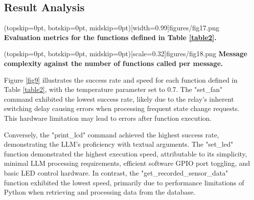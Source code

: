 \documentclass{ieeeaccess}
\begin{document}


\subsection{Result Analysis}
\Figure[h!](topskip=0pt, botskip=0pt,
midskip=0pt)[width=0.99\columnwidth]{{figures/fig17.png}}
{ \textbf{Evaluation metrics for the functions defined in Table \ref{table2}.}\label{fig9}}

\Figure[t!](topskip=0pt, botskip=0pt,
midskip=0pt)[scale=0.32]{{figures/fig18.png}}
{ \textbf{Message complexity against the number of functions called per message.}\label{fig10}}

Figure \ref{fig9} illustrates the success rate and speed for each function defined in Table \ref{table2}, with the temperature parameter set to 0.7. The "set\_fan" command exhibited the lowest success rate, likely due to the relay's inherent switching delay causing errors when processing frequent state change requests. This hardware limitation may lead to errors after function execution.  

Conversely, the "print\_lcd" command achieved the highest success rate, demonstrating the LLM's proficiency with textual arguments. The "set\_led" function demonstrated the highest execution speed, attributable to its simplicity, minimal LLM processing requirements, efficient software GPIO port toggling, and basic LED control hardware. In contrast, the "get\_recorded\_sensor\_data" function exhibited the lowest speed, primarily due to performance limitations of Python when retrieving and processing data from the database.
\end{document}
